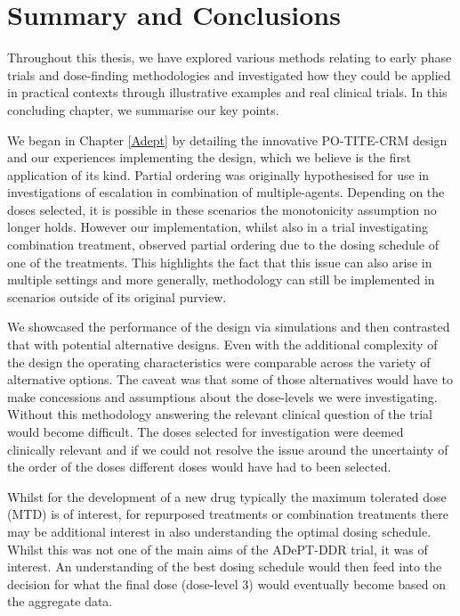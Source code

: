 
\chapter{Summary and Conclusions} %

\label{Conclusion} %

Throughout this thesis, we have explored various methods relating to early phase trials and dose-finding methodologies and investigated how they could be applied in practical contexts through illustrative examples and real clinical trials. In this concluding chapter, we summarise our key points. 

We began in Chapter \ref{Adept} by detailing the innovative PO-TITE-CRM design \cite{wagesContinualReassessmentMethod2011, wagesUsingTimetoeventContinual2013} and our experiences implementing the design, which we believe is the first application of its kind. Partial ordering was originally hypothesised for use in investigations of escalation in combination of multiple-agents. Depending on the doses selected, it is possible in these scenarios the monotonicity assumption no longer holds. However our implementation, whilst also in a trial investigating combination treatment, observed partial ordering due to the dosing schedule of one of the treatments. This highlights the fact that this issue can also arise in multiple settings and more generally, methodology can still be implemented in scenarios outside of its original purview.  

We showcased the performance of the design via simulations and then contrasted that with potential alternative designs. Even with the additional complexity of the design the operating characteristics were comparable across the variety of alternative options. The caveat was that some of those alternatives would have to make concessions and assumptions about the dose-levels we were investigating. Without this methodology answering the relevant clinical question of the trial would become difficult. The doses selected for investigation were deemed clinically relevant and if we could not resolve the issue around the uncertainty of the order of the doses different doses would have had to been selected. 

Whilst for the development of a new drug typically the maximum tolerated dose (MTD) is of interest, for repurposed treatments or combination treatments there may be additional interest in also understanding the optimal dosing schedule. Whilst this was not one of the main aims of the ADePT-DDR trial, it was of interest. An understanding of the best dosing schedule would then feed into the decision for what the final dose (dose-level 3) would eventually become based on the aggregate data. 

